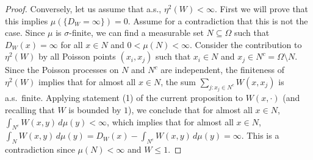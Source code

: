 \documentclass{amsart}
\numberwithin{equation}{section}
\numberwithin{figure}{section}
\theoremstyle{definition}
\theoremstyle{remark}
\begin{document}
\begin{proof}
Conversely, let us assume that a.s., $\eta^2(W)<\infty$. First we will prove
that this implies $\mu(\{D_W=\infty\})=0$. Assume for a contradiction that
this is not the case. Since $\mu$ is $\sigma$-finite, we can find a
measurable set $N\subseteq\Omega$ such that $D_W(x)=\infty$ for all $x\in N$
and $0<\mu(N)<\infty$. Consider the contribution to $\eta^2(W)$ by all
Poisson points $(x_i,x_j)$ such that $x_i\in N$ and $x_j\in
N^c=\Omega\setminus N$. Since the Poisson processes on $N$ and $N^c$ are
independent, the finiteness of $\eta^2(W)$ implies that for almost all $x\in
N$, the sum $\sum_{j:x_j\in N^c }W(x,x_j)$ is a.s.\ finite. Applying
statement (1) of the current proposition to $W(x,\cdot)$ (and recalling that
$W$ is bounded by $1$), we conclude that for almost all $x\in N$,
$\int_{N^c}W(x,y)\,d\mu(y)<\infty$, which implies that for almost all $x\in
N$, $\int_NW(x,y)\,d\mu(y)=D_W(x)-\int_{N^c}W(x,y)\,d\mu(y)=\infty$. This is
a contradiction since $\mu(N)<\infty$ and $W\leq 1$.


\end{proof}
\end{document}
